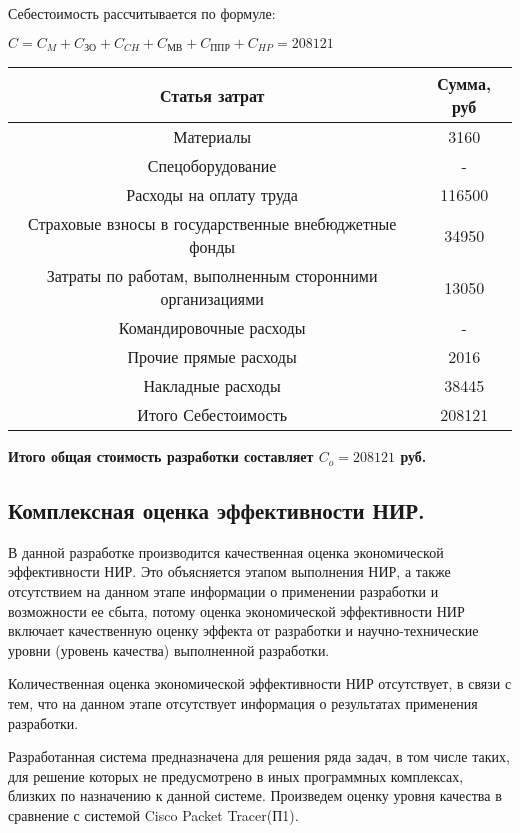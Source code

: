 Себестоимость рассчитывается по формуле:

$C = C_{M} + C_{\text{ЗО}} + C_{CH} + C_{\text{МВ}} + C_{\text{ППР}} + C_{HP} = 208121$

\begin{tabular}{|c|c|}
  \hline
  Статья затрат & Сумма, руб \\ \hline
  Материалы & 3160 \\ \hline
  Спецоборудование &  - \\ \hline
  Расходы на оплату труда & 116500\\ \hline
  Страховые взносы в государственные внебюджетные фонды & 34950\\ \hline
  Затраты по работам, выполненным сторонними организациями & 13050\\ \hline
  Командировочные расходы & - \\ \hline
  Прочие прямые расходы & 2016\\ \hline
  Накладные расходы & 38445\\ \hline
  Итого Себестоимость & 208121\\ \hline
\end{tabular}


\textbf{Итого общая стоимость разработки составляет $C_{o} = 208121$ руб.}

\subsection*{Комплексная оценка эффективности НИР.}

В данной разработке производится качественная оценка экономической эффективности НИР. Это объясняется этапом выполнения НИР, а также отсутствием на данном этапе информации о применении разработки и возможности ее сбыта, потому оценка экономической эффективности НИР включает качественную оценку эффекта от разработки и научно-технические уровни (уровень качества) выполненной разработки.

Количественная оценка экономической эффективности НИР отсутствует, в связи с тем, что на данном этапе отсутствует информация о результатах применения разработки.

Разработанная система предназначена для решения ряда задач, в том числе таких, для решение которых не предусмотрено в иных программных комплексах, близких по назначению к данной системе.  Произведем оценку уровня качества в сравнение с системой Cisco Packet Tracer(П1).

